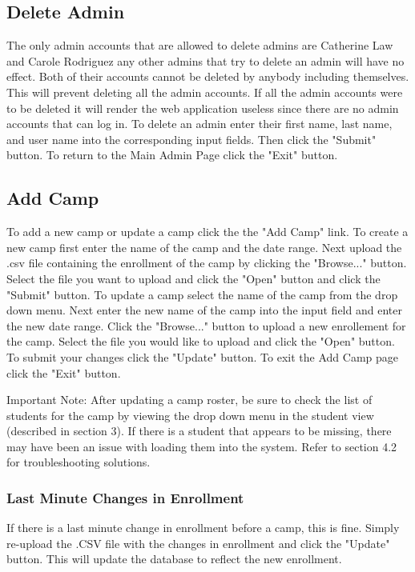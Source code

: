 \documentclass[letterpaper,10pt,serif, draftclsnofoot,onecolumn, compsoc, titlepage]{IEEEtran}
\begin{document}
\subsection{Delete Admin}
The only admin accounts that are allowed to delete admins are Catherine Law and Carole Rodriguez any other admins that try to delete an admin will have no effect.
Both of their accounts cannot be deleted by anybody including themselves.
This will prevent deleting all the admin accounts.
If all the admin accounts were to be deleted it will render the web application useless since there are no admin accounts that can log in.
To delete an admin enter their first name, last name, and user name into the corresponding input fields.
Then click the "Submit" button.
To return to the Main Admin Page click the "Exit" button. 
\subsection{Add Camp}
To add a new camp or update a camp click the the "Add Camp" link.
To create a new camp first enter the name of the camp and the date range.
Next upload the .csv file containing the enrollment of the camp  by clicking the "Browse..." button.
Select the file you want to upload and click the "Open" button and click the "Submit" button.
To update a camp select the name of the camp from the drop down menu.
Next enter the new name of the camp into the input field and enter the new date range.
Click the "Browse..." button to upload a new enrollement for the camp. Select the file you would like to upload and click the "Open" button.
To submit your changes click the "Update" button.
To exit the Add Camp page click the "Exit" button. 

Important Note:
After updating a camp roster, be sure to check the list of students for the camp by viewing the drop down menu in the student view (described in section 3).
If there is a student that appears to be missing, there may have been an issue with loading them into the system.
Refer to section 4.2 for troubleshooting solutions.
\subsubsection{Last Minute Changes in Enrollment}
If there is a last minute change in enrollment before a camp, this is fine.
Simply re-upload the .CSV file with the changes in enrollment and click the "Update" button.
This will update the database to reflect the new enrollment.
\end{document}
